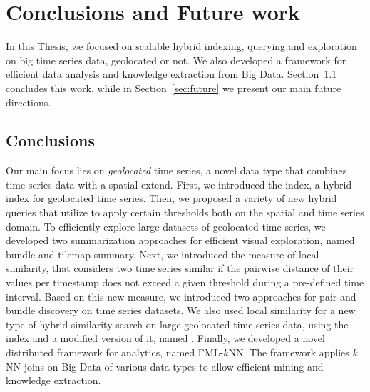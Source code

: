 
\chapter{Conclusions and Future work}
\label{chap:conclusions}

In this Thesis, we focused on scalable hybrid indexing, querying and exploration on big time series data, geolocated or not. We also developed a framework for efficient data analysis and knowledge extraction from Big Data. Section~\ref{sec:conc} concludes this work, while in Section~\ref{sec:future} we present our main future directions.

\section{Conclusions}
\label{sec:conc}
Our main focus lies on \textit{geolocated} time series, a novel data type that combines time series data with a spatial extend. First, we introduced the \btsr index, a hybrid index for geolocated time series. Then, we proposed a variety of new hybrid queries that utilize \btsr to apply certain thresholds both on the spatial and time series domain. To efficiently explore large datasets of geolocated time series, we developed two summarization approaches for efficient visual exploration, named bundle and tilemap summary. Next, we introduced the measure of local similarity, that considers two time series similar if the pairwise distance of their values per timestamp does not exceed a given threshold during a pre-defined time interval. Based on this new measure, we introduced two approaches for pair and bundle discovery on time series datasets. We also used local similarity for a new type of hybrid similarity search on large geolocated time series data, using the \btsr index and a modified version of it, named \sbtsr. Finally, we developed a novel distributed framework for analytics, named FML-$k$NN. The framework applies $k$NN joins on Big Data of various data types to allow efficient mining and knowledge extraction.

